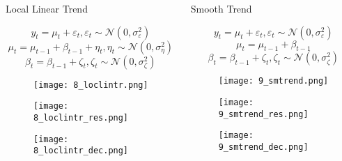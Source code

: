 \documentclass{beamer}
\begin{document}
\begin{frame}[fragile]
\begin{columns}[T]
\begin{column}{.32\textwidth}
\begin{columns}[T]
\begin{column}{.49\textwidth}
\begin{block}{Local Linear Trend}

\vspace{-0.25cm}

\[
y_t = \mu_t + \varepsilon_t, \varepsilon_t \sim \mathcal{N}(0, \sigma^2_\varepsilon)
\]
\[
\mu_t = \mu_{t-1} + \beta_{t-1} + \eta_t, \eta_t \sim \mathcal{N}(0, \sigma^2_\eta)
\]
\[
\beta_t = \beta_{t-1} + \zeta_t, \zeta_t \sim \mathcal{N}(0, \sigma_\zeta^2)
\]

\begin{figure}[htb]
\texttt{[image: 8\_loclintr.png]}
\end{figure}

\begin{figure}[htb]
\texttt{[image: 8\_loclintr\_res.png]}
\end{figure}

\begin{figure}[htb]
\texttt{[image: 8\_loclintr\_dec.png]}
\end{figure}

\end{block}
\end{column}

\begin{column}{.5\textwidth}
\begin{block}{Smooth Trend}

\vspace{-0.25cm}

\[
y_t = \mu_t + \varepsilon_t, \varepsilon_t \sim \mathcal{N}(0, \sigma^2_\varepsilon)
\]
\[
\mu_t = \mu_{t-1} + \beta_{t-1}
\]
\[
\beta_t = \beta_{t-1} + \zeta_t, \zeta_t \sim \mathcal{N}(0, \sigma_\zeta^2)
\]

\begin{figure}[htb]
\texttt{[image: 9\_smtrend.png]}
\end{figure}

\vspace{-0.13cm}

\begin{figure}[htb]
\texttt{[image: 9\_smtrend\_res.png]}
\end{figure}

\vspace{-0.14cm}

\begin{figure}[htb]
\texttt{[image: 9\_smtrend\_dec.png]}
\end{figure}


\end{block}
\end{column}
\end{columns}
\end{column}
\end{columns}
\end{frame}
\end{document}
